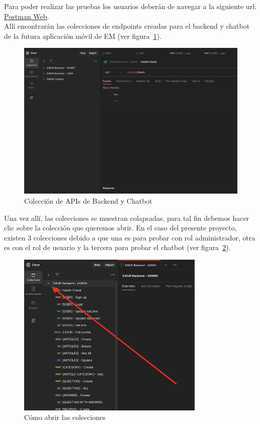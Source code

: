 Para poder realizar las pruebas los usuarios deberán de navegar a la siguiente url: \href{https://www.postman.com/cloudy-space-109868/workspace/emur/collection/27053529-4afae92f-7a66-4091-ad9b-50f499e2d515}{Postman Web}.\\
Allí encontrarán las colecciones de endpoints creadas para el backend y chatbot de la futura aplicación móvil de EM (ver figura~\ref{Img:Coleccion+Postman+Usuario}).
\begin{figure}[h]
    \centering
    \includegraphics[width=1.1\textwidth]{img/usuario/colecciones_postman1.png}
    \caption{Colección de APIs de Backend y Chatbot} \label{Img:Coleccion+Postman+Usuario}
\end{figure} 

Una vez allí, las colecciones se muestran colapsadas, para tal fin debemos hacer clic sobre la colección que queremos abrir. En el caso del presente proyecto, existen 3 colecciones debido a que una es para probar con rol administrador, otra es con el rol de usuario y la tercera para probar el chatbot (ver figura~\ref{Img:Coleccion+Postman+Usuario+2}).

\newpage
\begin{figure}[h]
    \centering
    \includegraphics[width=0.8\textwidth]{img/usuario/colecciones_postman2.png}
    \caption{Cómo abrir las colecciones} \label{Img:Coleccion+Postman+Usuario+2}
\end{figure} 

